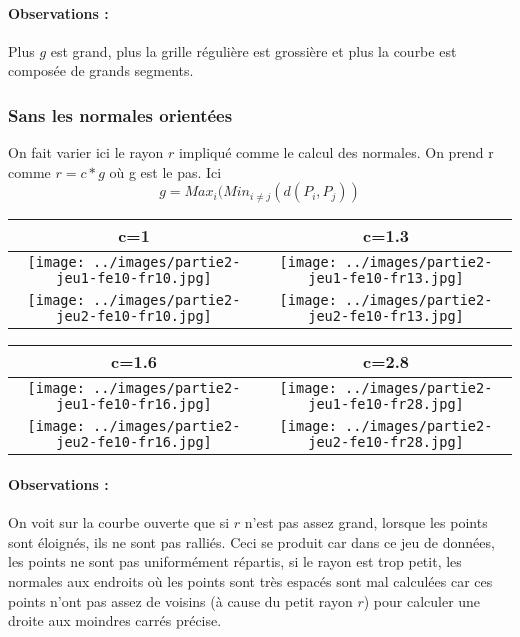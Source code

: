 \documentclass[11pt,a4paper]{article}
\begin{document}
\paragraph{Observations :} Plus $g$ est grand, plus la grille régulière est grossière et plus la courbe est composée de
grands segments.

\subsubsection{Sans les normales orientées}
On fait varier ici le rayon $r$ impliqué comme le calcul des normales. On prend r comme $r=c*g$ où g est le pas. Ici
$$g=Max_i(Min_{i \neq j}(d(P_i,P_j))$$

\begin{center}
\begin{tabular}{|c|c|}
\hline
c=1         & c=1.3\\
\hline
\hline
\texttt{[image: ../images/partie2-jeu1-fe10-fr10.jpg]} & \texttt{[image: ../images/partie2-jeu1-fe10-fr13.jpg]}\\
\hline
\texttt{[image: ../images/partie2-jeu2-fe10-fr10.jpg]} & \texttt{[image: ../images/partie2-jeu2-fe10-fr13.jpg]}\\
\hline
\end{tabular}

\begin{tabular}{|c|c|}
\hline
c=1.6  & c=2.8\\
\hline
\hline
\texttt{[image: ../images/partie2-jeu1-fe10-fr16.jpg]} & \texttt{[image: ../images/partie2-jeu1-fe10-fr28.jpg]}\\
\hline
\texttt{[image: ../images/partie2-jeu2-fe10-fr16.jpg]} & \texttt{[image: ../images/partie2-jeu2-fe10-fr28.jpg]}\\
\hline
\end{tabular}
\end{center}

\paragraph{Observations :} On voit sur la courbe ouverte que si $r$ n'est pas assez grand, lorsque les points sont éloignés, ils ne sont
pas ralliés. Ceci se produit car dans ce jeu de données, les points ne sont pas uniformément répartis, si le rayon est trop petit,
les normales aux endroits où les points sont très espacés sont mal calculées car ces points n'ont pas assez de voisins (à cause du petit rayon $r$)
pour calculer une droite aux moindres carrés précise.
\end{document}
